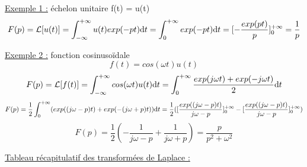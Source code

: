 	\underline{Exemple 1 :} échelon unitaire f(t) = u(t)
	\begin{equation*}
	F(p)=\mathcal{L}[u(t)] = \int_{-\infty}^{+\infty}u(t)exp(-pt) \mathrm{d} t =\int_{0}^{+\infty}exp(-pt) \mathrm{d} t = [-\frac{exp(pt)}{p}]_{0}^{+\infty}=\frac{1}{p}
	\end{equation*}
	
	\underline{Exemple 2 :} fonction cosinusoïdale
	\begin{equation*}
	f(t)=cos(\omega t)u(t)
	\end{equation*}
	\begin{equation*}
	F(p)=\mathcal{L}[f(t)]=\int_{-\infty}^{+\infty}cos(\omega t)u(t) \mathrm{d} t=\int_{0}^{+\infty}\frac{exp(j\omega t)+exp(-j\omega t)}{2} \mathrm{d} t
	\end{equation*}
	\begin{equation*}
	F(p)=\frac{1}{2}\int_{0}^{+\infty}(exp((j\omega-p) t)+exp(-(j\omega+p) t)) \mathrm{d} t=\frac{1}{2}([\frac{exp((j\omega-p) t)}{j\omega-p}]_{0}^{+\infty}-[\frac{exp((j\omega-p) t)}{j\omega-p}]_{0}^{+\infty})
	\end{equation*}
	\begin{equation}\label{}
	F(p)=\frac{1}{2}(-\frac{1}{j\omega-p}+\frac{1}{j\omega+p})=\frac{p}{p^{2}+\omega^{2}}
	\end{equation}
	
	\underline{Tableau récapitulatif des transformées de Laplace :}
	
